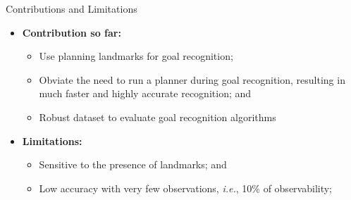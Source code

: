 \documentclass{beamer}
\newcommand{\todo}[1]{ {\color{red} #1} }
\begin{document}
	
	

\begin{frame}{Contributions and Limitations}
   	\begin{itemize}
   		\item \textbf{Contribution so far:}
			\begin{itemize}
				\item Use planning landmarks for goal recognition; 
				\item Obviate the need to run a planner during goal recognition, resulting in much faster and highly accurate recognition; and
                \item Robust dataset to evaluate goal recognition algorithms
			\end{itemize}
		\item \textbf{Limitations:}
			\begin{itemize}
				\item Sensitive to the presence of landmarks; and
				\item Low accuracy with very few observations, \emph{i.e.}, 10\% of observability;
			\end{itemize}
	\end{itemize}
\end{frame}		
\end{document}
